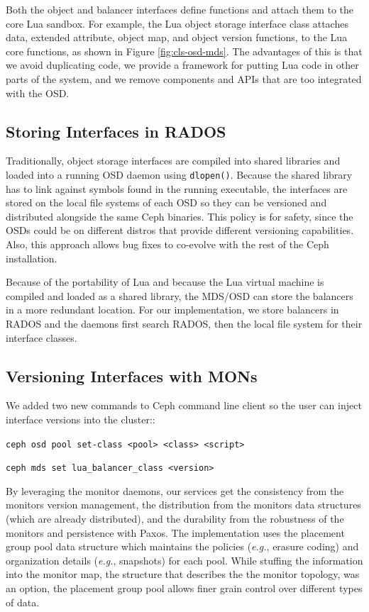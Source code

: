 \documentclass[10pt,twocolumn]{article}
\begin{document}
Both the object and balancer interfaces define functions and attach them
to the core Lua sandbox. For example, the Lua object storage interface
class attaches data, extended attribute, object map, and object version
functions, to the Lua core functions, as shown in Figure
\ref{fig:cls-osd-mds}. The advantages of this is that we avoid
duplicating code, we provide a framework for putting Lua code in other
parts of the system, and we remove components and APIs that are too
integrated with the OSD.

\subsection{Storing Interfaces in
RADOS}\label{storing-interfaces-in-rados}

Traditionally, object storage interfaces are compiled into shared
libraries and loaded into a running OSD daemon using \texttt{dlopen()}.
Because the shared library has to link against symbols found in the
running executable, the interfaces are stored on the local file systems
of each OSD so they can be versioned and distributed alongside the same
Ceph binaries. This policy is for safety, since the OSDs could be on
different distros that provide different versioning capabilities. Also,
this approach allows bug fixes to co-evolve with the rest of the Ceph
installation.

Because of the portability of Lua and because the Lua virtual machine is
compiled and loaded as a shared library, the MDS/OSD can store the
balancers in a more redundant location. For our implementation, we store
balancers in RADOS and the daemons first search RADOS, then the local
file system for their interface classes.

\subsection{Versioning Interfaces with
MONs}\label{versioning-interfaces-with-mons}

We added two new commands to Ceph command line client so the user can
inject interface versions into the cluster::

\noindent \texttt{ceph\ osd\ pool\ set-class\ \textless{}pool\textgreater{}\ \textless{}class\textgreater{}\ \textless{}script\textgreater{}}

\noindent \texttt{ceph\ mds\ set\ lua\_balancer\_class\ \textless{}version\textgreater{}}

By leveraging the monitor daemons, our services get the consistency from
the monitors version management, the distribution from the monitors data
structures (which are already distributed), and the durability from the
robustness of the monitors and persistence with Paxos. The
implementation uses the placement group pool data structure which
maintains the policies (\emph{e.g.}, erasure coding) and organization
details (\emph{e.g.}, snapshots) for each pool. While stuffing the
information into the monitor map, the structure that describes the the
monitor topology, was an option, the placement group pool allows finer
grain control over different types of data.
\end{document}
